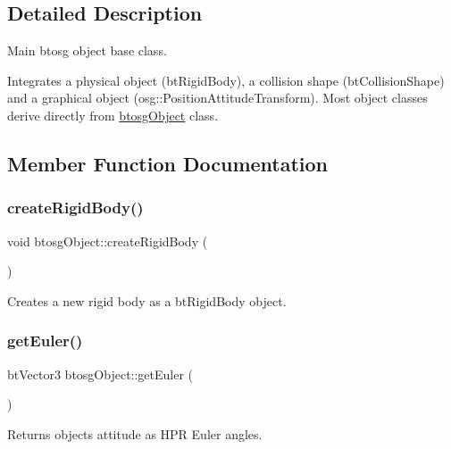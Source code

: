 \subsection{Detailed Description}
Main btosg object base class. 

Integrates a physical object (bt\+Rigid\+Body), a collision shape (bt\+Collision\+Shape) and a graphical object (osg\+::\+Position\+Attitude\+Transform). Most object classes derive directly from \hyperlink{classbtosgObject}{btosg\+Object} class. 

\subsection{Member Function Documentation}
\mbox{\label{classbtosgObject_a029dbe9134fa94e7355799f67fb2cd6d}} 
\subsubsection{\texorpdfstring{create\+Rigid\+Body()}{createRigidBody()}}
{\footnotesize\ttfamily void btosg\+Object\+::create\+Rigid\+Body (\begin{DoxyParamCaption}{ }\end{DoxyParamCaption})\hspace{0.3cm}{\ttfamily [inline]}}

Creates a new rigid body as a bt\+Rigid\+Body object. \mbox{\label{classbtosgObject_afef1fe06635566ab9cee134f72439e02}} 
\subsubsection{\texorpdfstring{get\+Euler()}{getEuler()}}
{\footnotesize\ttfamily bt\+Vector3 btosg\+Object\+::get\+Euler (\begin{DoxyParamCaption}{ }\end{DoxyParamCaption})\hspace{0.3cm}{\ttfamily [inline]}}

Returns object\textquotesingle{}s attitude as H\+PR Euler angles. \mbox{\label{classbtosgObject_a77a1434498d7a6d00c415042a995d119}} 
